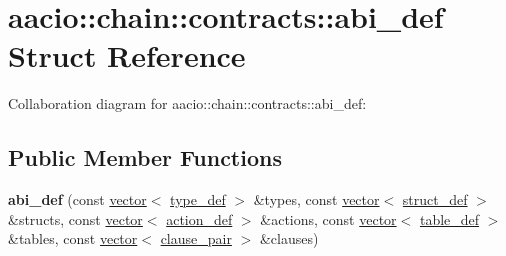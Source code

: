 \hypertarget{structaacio_1_1chain_1_1contracts_1_1abi__def}{}\section{aacio\+:\+:chain\+:\+:contracts\+:\+:abi\+\_\+def Struct Reference}
\label{structaacio_1_1chain_1_1contracts_1_1abi__def}


Collaboration diagram for aacio\+:\+:chain\+:\+:contracts\+:\+:abi\+\_\+def\+:
\subsection*{Public Member Functions}
\begin{DoxyCompactItemize}
\item 
\mbox{\label{structaacio_1_1chain_1_1contracts_1_1abi__def_a2e9701a2d044faa1599b6b4614239791}} 
{\bfseries abi\+\_\+def} (const \mbox{\hyperlink{classstd_1_1vector}{vector}}$<$ \mbox{\hyperlink{structaacio_1_1chain_1_1contracts_1_1type__def}{type\+\_\+def}} $>$ \&types, const \mbox{\hyperlink{classstd_1_1vector}{vector}}$<$ \mbox{\hyperlink{structaacio_1_1chain_1_1contracts_1_1struct__def}{struct\+\_\+def}} $>$ \&structs, const \mbox{\hyperlink{classstd_1_1vector}{vector}}$<$ \mbox{\hyperlink{structaacio_1_1chain_1_1contracts_1_1action__def}{action\+\_\+def}} $>$ \&actions, const \mbox{\hyperlink{classstd_1_1vector}{vector}}$<$ \mbox{\hyperlink{structaacio_1_1chain_1_1contracts_1_1table__def}{table\+\_\+def}} $>$ \&tables, const \mbox{\hyperlink{classstd_1_1vector}{vector}}$<$ \mbox{\hyperlink{structaacio_1_1chain_1_1contracts_1_1clause__pair}{clause\+\_\+pair}} $>$ \&clauses)
\end{DoxyCompactItemize}
